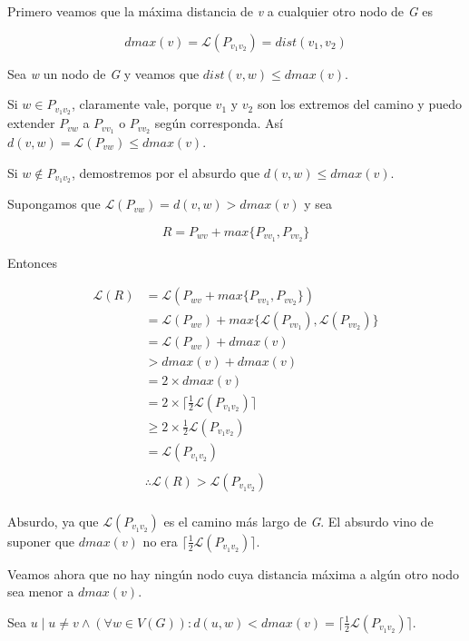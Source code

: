\documentclass[a4paper]{report}
\begin{document}
Primero veamos que la máxima distancia de \textit{v} a cualquier otro nodo de \textit{G} es

$$
dmax(v) = \mathcal{L}(P_{v_{1} v_{2}}) = dist(v_{1}, v_{2})
$$

Sea \textit{w} un nodo de \textit{G} y veamos que $dist(v,w) \leq dmax(v)$.

Si $w \in P_{v_{1} v_{2}}$, claramente vale, porque $v_{1}$ y $v_{2}$ son los extremos del camino y puedo extender $P_{vw}$ a $P_{v v_{1}}$ o $P_{v v_{2}}$ según corresponda. Así $d(v,w) = \mathcal{L}(P_{vw}) \leq dmax(v)$.

Si $w \notin P_{v_{1} v_{2}}$, demostremos por el absurdo que $d(v,w) \leq dmax(v)$.

Supongamos que $\mathcal{L}(P_{vw}) = d(v,w) > dmax(v)$ y sea

$$
R = P_{wv} + max\{ P_{v v_{1}}, P_{v v_{2}} \}
$$

Entonces

\begin{align*}
	\mathcal{L}(R) &= \mathcal{L}(P_{wv} + max\{ P_{v v_{1}}, P_{v v_{2}} \}) \\
	&= \mathcal{L}(P_{wv}) + max\{ \mathcal{L}(P_{v v_{1}}), \mathcal{L}(P_{v v_{2}}) \} \\
	&= \mathcal{L}(P_{wv}) + dmax(v) \\
	&> dmax(v) + dmax(v) \\
	&= 2 \times dmax(v) \\
	&= 2 \times \lceil \tfrac{1}{2} \mathcal{L}(P_{v_{1} v_{2}}) \rceil \\
	& \geq 2 \times \tfrac{1}{2} \mathcal{L}(P_{v_{1} v_{2}}) \\
	&= \mathcal{L}(P_{v_{1} v_{2}}) \\
	& \\
	& \therefore \mathcal{L}(R) > \mathcal{L}(P_{v_{1} v_{2}}) \\
\end{align*}


Absurdo, ya que $\mathcal{L}(P_{v_{1} v_{2}})$ es el camino más largo de \textit{G}. El absurdo vino de suponer que $dmax(v)$ no era $\lceil \frac{1}{2} \mathcal{L}(P_{v_{1} v_{2}}) \rceil$.

\medskip

Veamos ahora que no hay ningún nodo cuya distancia máxima a algún otro nodo sea menor a $dmax(v)$.

Sea $u \mid u \neq v \land (\forall w \in V(G)) : d(u,w) < dmax(v) = \lceil \frac{1}{2} \mathcal{L}(P_{v_{1} v_{2}}) \rceil$.
\end{document}
